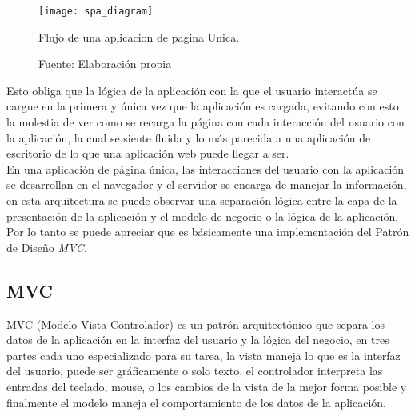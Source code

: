 \begin{figure}[H]
  \begin{center}
    \texttt{[image: spa\_diagram]}
    \caption{Flujo de una aplicacion de pagina Unica.}
    \label{fig:spa_diagram}
    \caption*{Fuente: Elaboración propia}
  \end{center}
\end{figure}


Esto obliga que la lógica de la aplicación con la que el usuario interactúa se cargue en la primera y única vez que la aplicación es cargada, evitando con esto la molestia de ver como se recarga la página con cada interacción del usuario con la aplicación, la cual se siente fluida y lo más parecida a una aplicación de escritorio de lo que una aplicación web puede llegar a ser.\\




%

En una aplicación de página única, las interacciones del usuario con la aplicación se desarrollan en el navegador y el servidor se encarga de manejar la información, en esta arquitectura se puede observar una separación lógica entre la capa de la presentación de la aplicación y el modelo de negocio o la lógica de la aplicación. Por lo tanto se puede apreciar que es básicamente una implementación del Patrón de Diseño \emph{MVC}.\\


\subsection{MVC} %
\label{sub:mvc}
  MVC (Modelo Vista  Controlador) es un patrón arquitectónico que separa
  los datos de la aplicación en la interfaz del usuario y  la lógica del
  negocio, en tres partes cada uno especializado para su tarea, la vista
  maneja lo que es la interfaz del usuario, puede ser gráficamente o solo texto,
  el controlador interpreta las entradas del teclado, mouse, o los cambios
  de la vista de la mejor forma posible y finalmente el modelo maneja el comportamiento
  de los datos de la aplicación.\cite{steveburbeck1992}\\

